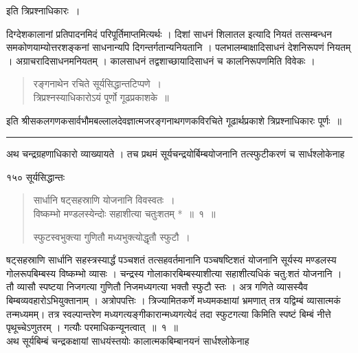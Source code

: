 \documentclass[11pt, openany]{book}
\begin{document}
\begin{center}
{\huge{इति त्रिप्रश्नाधिकारः~।}}
\end{center}
\vspace{4mm}

\begin{sloppypar}
दिग्देशकालानां प्रतिपादनमिदं परिपूर्तिमाप्तमित्यर्थः । दिशां साधनं शिलातल इत्यादि नियतं तत्सम्बन्धन समकोणयाम्योत्तरशङ्कनां साधनान्यपि दिगन्तर्गतान्यनियतानि । पलभालम्बाक्षादिसाधनं देशनिरूपणं नियतम् । अग्राचरादिसाधनमनियतम् । कालसाधनं तद्वशाच्छायादिसाधनं च कालनिरूपणमिति विवेकः ।
\end{sloppypar}


\begin{quote}
{\qt रङ्गनाथेन रचिते सूर्यसिद्धान्तटिप्पणे~।\\
त्रिप्रश्नस्याधिकारोऽयं पूर्णो गूढप्रकाशके~॥}
\end{quote}

इति श्रीसकलगणकसार्वभौमबल्लालदेवज्ञात्मजरङ्गनाथगणकविरचिते गूढार्थप्रकाशे त्रिप्रश्नाधिकारः पूर्णः~॥

\vspace{4mm}
   
\begin{center}
\rule{7em}{.5pt}
\end{center}
\vspace{4mm}

 अथ चन्द्रग्रहणाधिकारो व्याख्यायते । तच प्रथमं सूर्यचन्द्रयोर्बिम्बयोजनानि तत्स्फुटीकरणं च सार्धश्लोकेनाह\textendash

\newpage


 \noindent १५० \hspace{4cm} सूर्यसिद्धान्तः 
\vspace{1cm}


\begin{quote}
 {\ssi सार्धानि षट्सहस्राणि योजनानि विवस्वतः~। \\ 
विष्कम्भो मण्डलस्येन्दोः सहाशीत्या चतुःशतम् *~॥~१~॥

स्फुटस्वभुक्त्या गुणितौ मध्यभुक्त्योद्धृतौ स्फुटौ~।}
\end{quote}

\begin{sloppypar}
षट्सहस्राणि सार्धानि सहस्त्रस्यार्द्धं पञ्चशतं तत्सहवर्तमानानि पञ्चषष्टिशतं योजनानि सूर्यस्य मण्डलस्य गोलरूपबिम्बस्य विष्कम्भो व्यासः । चन्द्रस्य गोलाकारबिम्बस्याशीत्या सहाशीत्यधिकं चतु:शतं योजनानि । तौ व्यासौ स्पष्टया निजगत्या गुणितौ निजमध्यगत्या भक्तौ स्फुटौ स्तः । अत्र गणिते व्यासस्यैव बिम्बव्यवहारोऽभियुक्तानाम् । अत्रोपपत्तिः । त्रिज्यामितकर्णे मध्यमकक्षायां भ्रमणात् तत्र यद्विम्बं व्यासात्मकं तन्मध्यमम्। तत्र स्वल्पान्तरेण मध्यगत्यङ्गीकारान्मध्यगत्येदं तदा स्फुटगत्या किमिति स्पष्टं बिम्बं नीत्ते पृथूच्चेऽणुतरम् । गत्यौः परमाधिकन्यूनत्वात्~॥~१~॥\\
\noindent अथ सूर्यबिम्बं चन्द्रकक्षायां साधयंस्तयोः कालात्मकबिम्बानयनं सार्धश्लोकेनाह\textendash
\end{sloppypar}
\end{document}
